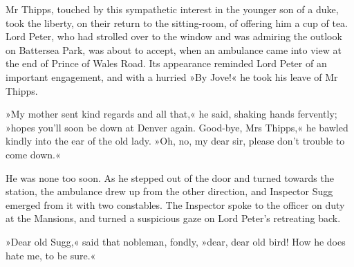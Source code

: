 Mr Thipps, touched by this sympathetic interest in the younger son of a duke, took the liberty, on their return to the sitting-room, of offering him a cup of tea. Lord Peter, who had strolled over to the window and was admiring the outlook on Battersea Park, was about to accept, when an ambulance came into view at the end of Prince of Wales Road. Its appearance reminded Lord Peter of an important engagement, and with a hurried »By Jove!« he took his leave of Mr Thipps.

»My mother sent kind regards and all that,« he said, shaking hands fervently; »hopes you'll soon be down at Denver again. Good-bye, Mrs Thipps,« he bawled kindly into the ear of the old lady. »Oh, no, my dear sir, please don't trouble to come down.«

He was none too soon. As he stepped out of the door and turned towards the station, the ambulance drew up from the other direction, and Inspector Sugg emerged from it with two constables. The Inspector spoke to the officer on duty at the Mansions, and turned a suspicious gaze on Lord Peter's retreating back.

»Dear old Sugg,« said that nobleman, fondly, »dear, dear old bird! How he does hate me, to be sure.«